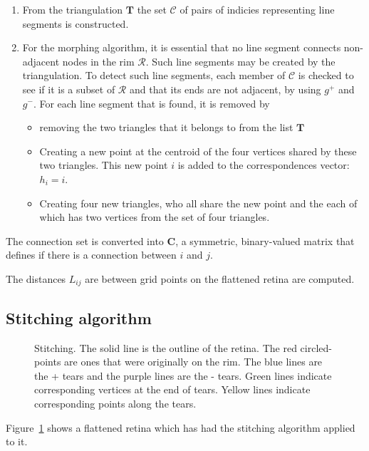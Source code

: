 \documentclass{article}
\begin{document}
\begin{enumerate}
\item From the triangulation $\mathbf{T}$ the set $\mathcal{C}$ of pairs of
  indicies representing line segments is constructed.
\item For the morphing algorithm, it is essential that no line segment
  connects non-adjacent nodes in the rim $\mathcal{R}$. Such line
  segments may be created by the triangulation. To detect such line
  segments, each member of $\mathcal{C}$ is checked to see if it is a
  subset of $\mathcal{R}$ and that its ends are not adjacent, by
  using $g^+$ and $g^-$. For each line segment that is found, it is
  removed by
  \begin{itemize}
  \item removing the two triangles that it belongs to from the list
    $\mathbf{T}$
  \item Creating a new point at the centroid of the four vertices
    shared by these two triangles. This new point $i$ is added to the
    correspondences vector: $h_i=i$.
  \item Creating four new triangles, who all share the new point and
    the each of which has two vertices from the set of four
    triangles.
  \end{itemize}
\end{enumerate}

The connection set is converted into $\mathbf{C}$, a symmetric,
binary-valued matrix that defines if there is a connection between $i$
and $j$.  

The distances $L_{ij}$ are between grid points on the flattened retina
are computed.

\subsection{Stitching algorithm}
\label{fold-sphere:sec:stitching-algorithm}

\begin{figure}[tp]
  \centering
  \caption{Stitching. The solid line is the outline of the retina. The
    red circled-points are ones that were originally on the rim. The
    blue lines are the + tears and the purple lines are the - tears.
    Green lines indicate corresponding vertices at the end of tears.
    Yellow lines indicate corresponding points along the tears. }
  \label{fold-sphere:fig:stitch}
\end{figure}

Figure~\ref{fold-sphere:fig:stitch} shows a flattened
retina which has had the stitching algorithm applied to it. 
\end{document}
